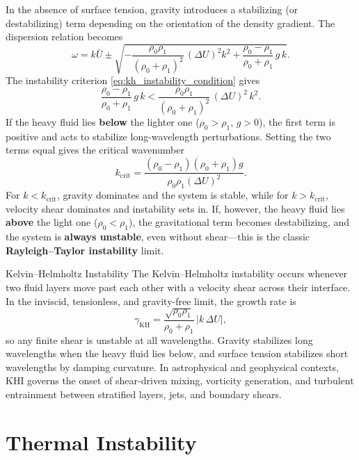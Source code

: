 In the absence of surface tension, gravity introduces a stabilizing (or destabilizing) term depending on the orientation of the density gradient.  
The dispersion relation becomes
\begin{equation}
\omega = k \bar{U} 
\pm 
\sqrt{
-\frac{\rho_0 \rho_1}{(\rho_0 + \rho_1)^2}\,(\Delta U)^2 k^2
+ \frac{\rho_0 - \rho_1}{\rho_0 + \rho_1}\,g\,k }.
\end{equation}
The instability criterion \eqref{eq:kh_instability_condition} gives
\begin{equation}
\frac{\rho_0 - \rho_1}{\rho_0 + \rho_1}\,g\,k
<
\frac{\rho_0 \rho_1}{(\rho_0 + \rho_1)^2}\,(\Delta U)^2\,k^2.
\end{equation}
If the heavy fluid lies \textbf{below} the lighter one ($\rho_0 > \rho_1$, $g > 0$), 
the first term is positive and acts to stabilize long-wavelength perturbations.  
Setting the two terms equal gives the critical wavenumber
\begin{equation}
k_{\mathrm{crit}} = \frac{(\rho_0 - \rho_1)(\rho_0 + \rho_1)g}{\rho_0 \rho_1 (\Delta U)^2}.
\end{equation}
For $k < k_{\mathrm{crit}}$, gravity dominates and the system is stable, 
while for $k > k_{\mathrm{crit}}$, velocity shear dominates and instability sets in.  
If, however, the heavy fluid lies \textbf{above} the light one ($\rho_0 < \rho_1$), 
the gravitational term becomes destabilizing, and the system is \textbf{always unstable}, even without shear—this is the classic \textbf{Rayleigh--Taylor instability} limit.

\begin{bigidea}{Kelvin--Helmholtz Instability}
The Kelvin--Helmholtz instability occurs whenever two fluid layers move past each other with a velocity shear across their interface.  
In the inviscid, tensionless, and gravity-free limit, the growth rate is
\[
\gamma_{\mathrm{KH}} = \frac{\sqrt{\rho_0 \rho_1}}{\rho_0 + \rho_1}\,|k\,\Delta U|,
\]
so any finite shear is unstable at all wavelengths.  
Gravity stabilizes long wavelengths when the heavy fluid lies below, 
and surface tension stabilizes short wavelengths by damping curvature.  
In astrophysical and geophysical contexts, KHI governs the onset of shear-driven mixing, vorticity generation, 
and turbulent entrainment between stratified layers, jets, and boundary shears.
\end{bigidea}


\section{Thermal Instability}
\label{sec:thermal_instability}

